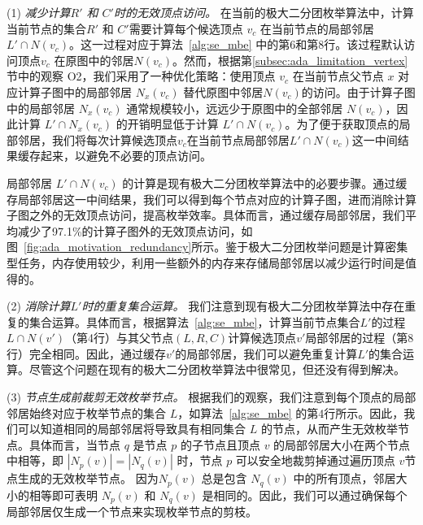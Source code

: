 (1) \textit{减少计算$R'$ 和 $C'$时的无效\emph{顶点}访问。} 
在当前的极大二分团枚举算法中，计算当前节点的集合$R'$ 和 $C'$需要计算每个候选顶点 $v_c$ 在当前节点的局部邻居 $L' \cap N(v_c)$。这一过程对应于算法~\ref{alg:se_mbe} 中的第6和第8行。该过程默认访问顶点$v_c$ 在原图中的邻居$N(v_c)$。然而，根据第\ref{subsec:ada_limitation_vertex}节中的观察 O2，我们采用了一种优化策略：使用顶点 $v_c$ 在当前节点父节点 $x$ 对应计算子图中的局部邻居 $N_x(v_c)$ 替代原图中邻居$N(v_c)$的访问。由于计算子图中的局部邻居 $N_x(v_c)$ 通常规模较小，远远少于原图中的全部邻居 $N(v_c)$，因此计算 $L' \cap N_x(v_c)$ 的开销明显低于计算 $L' \cap N(v_c)$。为了便于获取顶点的局部邻居，我们将每次计算候选顶点$v_c$在当前节点局部邻居$L' \cap N(v_c)$这一中间结果缓存起来，以避免不必要的顶点访问。

局部邻居 $L' \cap N(v_c)$ 的计算是现有极大二分团枚举算法中的必要步骤。通过缓存局部邻居这一中间结果，我们可以得到每个节点对应的计算子图，进而消除计算子图之外的无效顶点访问，提高枚举效率。具体而言，通过缓存局部邻居，我们平均减少了97.1\%的计算子图外的无效顶点访问，如图~\ref{fig:ada_motivation_redundancy}所示。鉴于极大二分团枚举问题是计算密集型任务，内存使用较少，利用一些额外的内存来存储局部邻居以减少运行时间是值得的。

(2) \textit{消除计算$L'$时的重复\emph{集合}运算。}
我们注意到现有极大二分团枚举算法中存在重复的集合运算。具体而言，根据算法~\ref{alg:se_mbe}，计算当前节点集合$L'$的过程$L \cap N(v')$（第4行）与其父节点$(L, R, C)$计算候选顶点$v'$局部邻居的过程（第8行）完全相同。因此，通过缓存$v'$的局部邻居，我们可以避免重复计算$L'$的集合运算。尽管这个问题在现有的极大二分团枚举算法中很常见，但还没有得到解决。

(3) \textit{节点生成前裁剪无效\emph{枚举节点}。}
根据我们的观察，我们注意到每个顶点的局部邻居始终对应于枚举节点的集合 $L$，如算法~\ref{alg:se_mbe} 的第4行所示。因此，我们可以知道相同的局部邻居将导致具有相同集合 $L$ 的节点，从而产生无效枚举节点。具体而言，当节点 $q$ 是节点 $p$ 的子节点且顶点 $v$ 的局部邻居大小在两个节点中相等，即 $|N_p(v)| = |N_q(v)|$ 时，节点 $p$ 可以安全地裁剪掉通过遍历顶点 $v$节点生成的无效枚举节点。 因为$N_p(v)$ 总是包含 $N_q(v)$ 中的所有顶点，邻居大小的相等即可表明 $N_p(v)$ 和 $N_q(v)$ 是相同的。因此，我们可以通过确保每个局部邻居仅生成一个节点来实现枚举节点的剪枝。






